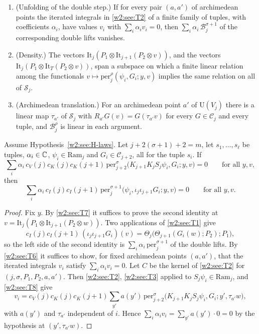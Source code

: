 \begin{hypothesis}
\begin{enumerate}[label=(T\arabic*),leftmargin=*]
\item\label{w2:see:T6} (Unfolding of the double step.) If for every pair $(a,a')$ of archimedean points the iterated integrals in \ref{w2:see:T2} of a finite family of tuples, with coefficients $\alpha_i$, have values $v_i$ with $\sum_i\alpha_iv_i=0$, then $\sum_i\alpha_i\,\mathcal B^{\sigma+1}_j$ of the corresponding double lifts vanishes.
\item\label{w2:see:T7} (Density.) The vectors $\mathrm{It}_j(P_1\otimes\mathrm{It}_{j+1}(P_2\otimes v))$, and the vectors $\mathrm{It}_j(P_1\otimes\mathrm{It}_T(P_2\otimes v))$, span a subspace on which a finite linear relation among the functionals $v\mapsto\mathrm{per}^\rho_j(\psi_i,G_i;y,v)$ implies the same relation on all of $\mathcal S_j$.
\item\label{w2:see:T8} (Archimedean translation.) For an archimedean point $a'$ of $\mathrm U(V_{j})$ there is a linear map $\tau_{a'}$ of $\mathcal S_j$ with $R_{a'}G(v)=G(\tau_{a'}v)$ for every $G\in\mathcal C_j$ and every tuple, and $\mathcal B^\rho_j$ is linear in each argument.
\end{enumerate}
\end{hypothesis}

\begin{proposition}\label{w2:see:step}
Assume Hypothesis~\ref{w2:see:H-laws}. Let $j+2(\sigma+1)+2=m$, let $s_1,\dots,s_\ell$ be tuples, $\alpha_i\in\mathbb C$, $\psi_i\in\mathrm{Ram}_j$ and $G_i\in\mathcal C_{j+2}$, all for the tuple $s_i$. If
\[
\sum_i\alpha_i\,c_V(j)c_K(j)c_K(j+1)\,\mathrm{per}^\sigma_{j+2}\bigl(K_{j+1}K_jS_j\psi_i,G_i;y,v\bigr)=0\qquad\text{for all }y,v,
\]
then
\[
\sum_i\alpha_i\,c_I(j)c_I(j+1)\,\mathrm{per}^{\sigma+1}_j\bigl(\psi_i,\iota_j\iota_{j+1}G_i;y,v\bigr)=0\qquad\text{for all }y,v.
\]
\end{proposition}

\begin{proof}
Fix $y$. By \ref{w2:see:T7} it suffices to prove the second identity at $v=\mathrm{It}_j(P_1\otimes\mathrm{It}_{j+1}(P_2\otimes w))$. Two applications of \ref{w2:see:T1} give
\[
c_I(j)c_I(j+1)\,(\iota_j\iota_{j+1}G_i)(v)=\Theta_j\bigl(\Theta_{j+1}(G_i(w);P_2);P_1\bigr),
\]
so the left side of the second identity is $\sum_i\alpha_i\,\mathrm{per}^{\sigma+1}_j$ of the double lifts. By \ref{w2:see:T6} it suffices to show, for fixed archimedean points $(a,a')$, that the iterated integrals $v_i$ satisfy $\sum_i\alpha_iv_i=0$. Let $C$ be the kernel of \ref{w2:see:T2} for $(j,\sigma,P_1,P_2,a,a')$. Then \ref{w2:see:T2}, \ref{w2:see:T3} applied to $S_j\psi_i\in\mathrm{Ram}_j$, and \ref{w2:see:T8} give
\[
v_i=c_V(j)c_K(j)c_K(j+1)\sum_{y'}a(y')\,\mathrm{per}^\sigma_{j+2}\bigl(K_{j+1}K_jS_j\psi_i,G_i;y',\tau_{a'}w\bigr),
\]
with $a(y')$ and $\tau_{a'}$ independent of $i$. Hence $\sum_i\alpha_iv_i=\sum_{y'}a(y')\cdot0=0$ by the hypothesis at $(y',\tau_{a'}w)$.
\end{proof}

